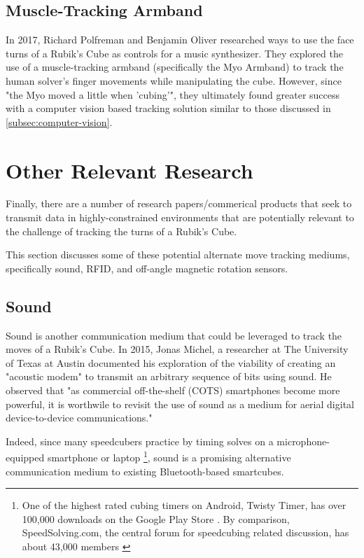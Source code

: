 \subsection{Muscle-Tracking Armband}
In 2017, Richard Polfreman and Benjamin Oliver researched ways to use the face turns of a Rubik's Cube as controls for a music synthesizer. They explored the use of a muscle-tracking armband (specifically the Myo Armband) to track the human solver's finger movements while manipulating the cube. However, since "the Myo moved a little when 'cubing'", they ultimately found greater success with a computer vision based tracking solution similar to those discussed in \ref{subsec:computer-vision}.


\section{Other Relevant Research}
Finally, there are a number of research papers/commerical products that seek to transmit data in highly-constrained environments that are potentially relevant to the challenge of tracking the turns of a Rubik's Cube.

This section discusses some of these potential alternate move tracking mediums, specifically sound, RFID, and off-angle magnetic rotation sensors.

\subsection{Sound}
Sound is another communication medium that could be leveraged to track the moves of a Rubik's Cube. In 2015, Jonas Michel, a researcher at The University of Texas at Austin documented his exploration of the viability of creating an "acoustic modem" to transmit an arbitrary sequence of bits using sound.
He observed that "as commercial off-the-shelf (COTS) smartphones become more powerful, it is worthwile to revisit the use of sound as a medium for aerial digital device-to-device communications." \cite{michel-sound}

Indeed, since many speedcubers practice by timing solves on a microphone-equipped smartphone or laptop \footnote{One of the highest rated cubing timers on Android, Twisty Timer, has over 100,000 downloads on the Google Play Store \cite{googleplay-twistytimer}. By comparison, SpeedSolving.com, the central forum for speedcubing related discussion, has about 43,000 members \cite{speedsolving-com}}, sound is a promising alternative communication medium to existing Bluetooth-based smartcubes.

